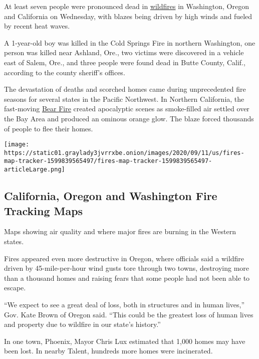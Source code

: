 At least seven people were pronounced dead in
\href{https://www.nytimes3xbfgragh.onion/2020/09/10/us/wildfires-live-updates.html}{wildfires}
in Washington, Oregon and California on Wednesday, with blazes being
driven by high winds and fueled by recent heat waves.

A 1-year-old boy was killed in the Cold Springs Fire in northern
Washington, one person was killed near Ashland, Ore., two victims were
discovered in a vehicle east of Salem, Ore., and three people were found
dead in Butte County, Calif., according to the county sheriff's offices.

The devastation of deaths and scorched homes came during unprecedented
fire seasons for several states in the Pacific Northwest. In Northern
California, the fast-moving
\href{https://www.nytimes3xbfgragh.onion/2020/09/10/us/wildfires-help-ca-or-wa.html}{Bear
Fire} created apocalyptic scenes as smoke-filled air settled over the
Bay Area and produced an ominous orange glow. The blaze forced thousands
of people to flee their homes.

\href{https://www.nytimes3xbfgragh.onion/interactive/2020/us/fires-map-tracker.html}{}

\texttt{[image: https://static01.graylady3jvrrxbe.onion/images/2020/09/11/us/fires-map-tracker-1599839565497/fires-map-tracker-1599839565497-articleLarge.png]}

\hypertarget{california-oregon-and-washington-fire-tracking-maps}{%
\subsection{California, Oregon and Washington Fire Tracking
Maps}\label{california-oregon-and-washington-fire-tracking-maps}}

Maps showing air quality and where major fires are burning in the
Western states.

Fires appeared even more destructive in Oregon, where officials said a
wildfire driven by 45-mile-per-hour wind gusts tore through two towns,
destroying more than a thousand homes and raising fears that some people
had not been able to escape.

``We expect to see a great deal of loss, both in structures and in human
lives,'' Gov. Kate Brown of Oregon said. ``This could be the greatest
loss of human lives and property due to wildfire in our state's
history.''

In one town, Phoenix, Mayor Chris Lux estimated that 1,000 homes may
have been lost. In nearby Talent, hundreds more homes were incinerated.


